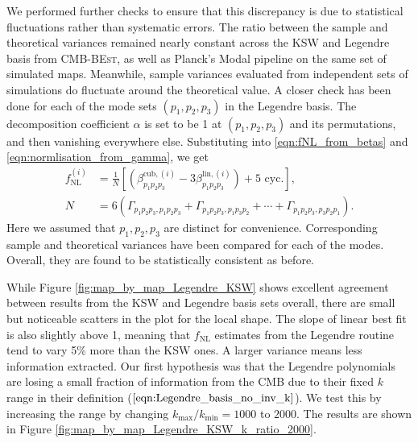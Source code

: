 We performed further checks to ensure that this discrepancy is due to statistical fluctuations rather than systematic errors. The ratio between the sample and theoretical variances remained nearly constant across the KSW and Legendre basis from \textsc{CMB-BEst}, as well as Planck's Modal pipeline on the same set of simulated maps. Meanwhile, sample variances evaluated from independent sets of simulations do fluctuate around the theoretical value. A closer check has been done for each of the mode sets $(p_1,p_2,p_3)$ in the Legendre basis. The decomposition coefficient $\alpha$ is set to be 1 at $(p_1,p_2,p_3)$ and its permutations, and then vanishing everywhere else. Substituting into \eqref{eqn:fNL_from_betas} and \eqref{eqn:normlisation_from_gamma}, we get
\begin{align}
	f_\text{NL}^{(i)} &= \frac{1}{N} \left[ \left( \beta^{\textrm{cub},(i)}_{p_1 p_2 p_3} - 3 \beta^{\textrm{lin},(i)}_{p_1 p_2 p_3} \right) + \text{5 cyc.} \right], \\
	N &= 6\left( \Gamma_{p_1 p_2 p_3, p_1 p_2 p_3} + \Gamma_{p_1 p_2 p_3, p_1 p_3 p_2} + \cdots + \Gamma_{p_1 p_2 p_3, p_3 p_2 p_1} \right).
\end{align}
Here we assumed that $p_1,p_2,p_3$ are distinct for convenience. Corresponding sample and theoretical variances have been compared for each of the modes. Overall, they are found to be statistically consistent as before.


While Figure \ref{fig:map_by_map_Legendre_KSW} shows excellent agreement between results from the KSW and Legendre basis sets overall, there are small but noticeable scatters in the plot for the local shape. The slope of linear best fit is also slightly above 1, meaning that $f_\text{NL}$ estimates from the Legendre routine tend to vary 5\% more than the KSW ones. A larger variance means less information extracted. Our first hypothesis was that the Legendre polynomials are losing a small fraction of information from the CMB due to their fixed $k$ range in their definition ($\ref{eqn:Legendre_basis_no_inv_k}$). We test this by increasing the range by changing $k_\text{max}/k_\text{min} = 1000$ to $2000$. The results are shown in Figure \ref{fig:map_by_map_Legendre_KSW_k_ratio_2000}.

